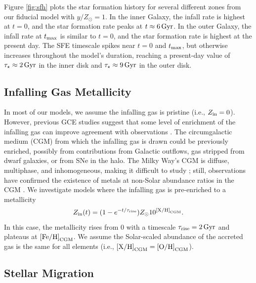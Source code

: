 \documentclass[twocolumn,twocolappendix]{aastex701}
\newcommand{\mathXH}{{\rm [X/H]}}
\newcommand{\mathOH}{{\rm [O/H]}}
\newcommand{\mathFeH}{{\rm [Fe/H]}}
\begin{document}
Figure \ref{fig:sfh} plots the star formation history for several different zones from our fiducial model with $y/Z_\odot=1$. In the inner Galaxy, the infall rate is highest at $t=0$, and the star formation rate peaks at $t\approx6\,{\rm Gyr}$. In the outer Galaxy, the infall rate at $t_{\rm max}$ is similar to $t=0$, and the star formation rate is highest at the present day. The SFE timescale spikes near $t=0$ and $t_{\rm max}$, but otherwise increases throughout the model's duration, reaching a present-day value of $\tau_\star\approx2\,{\rm Gyr}$ in the inner disk and $\tau_\star\approx 9\,{\rm Gyr}$ in the outer disk.

\subsection{Infalling Gas Metallicity}
\label{sec:cgm-enrichment}

In most of our models, we assume the infalling gas is pristine (i.e., $Z_{\rm in}=0$). However, previous GCE studies suggest that some level of enrichment of the infalling gas can improve agreement with observations \citep[e.g.,][]{palla_chemical_2020,spitoni_remind_2024,johnson_milky_2025}. The circumgalactic medium (CGM) from which the infalling gas is drawn could be previously enriched, possibly from contributions from Galactic outflows, gas stripped from dwarf galaxies, or from SNe in the halo. The Milky Way's CGM is diffuse, multiphase, and inhomogeneous, making it difficult to study \citep[e.g.,][]{tumlinson_circumgalactic_2017,mathur_probing_2022}; still, observations have confirmed the existence of metals at non-Solar abundance ratios in the CGM \citep[e.g.,][]{das_discovery_2019,das_hot_2021,gupta_supervirial_2021}. We investigate models where the infalling gas is pre-enriched to a metallicity
\begin{equation}
    \label{eq:pre-enrichment}
    Z_{\rm in}(t) = (1 - e^{-t/\tau_{\rm rise}}) Z_\odot 10^{\mathXH_{\rm CGM}}.
\end{equation}
In this case, the metallicity rises from 0 with a timescale $\tau_{\rm rise}=2\,{\rm Gyr}$ and plateaus at $\mathFeH_{\rm CGM}$. We assume the Solar-scaled abundance of the accreted gas is the same for all elements (i.e., $\mathXH_{\rm CGM}=\mathOH_{\rm CGM}$).

\subsection{Stellar Migration}
\label{sec:migration}
\end{document}
